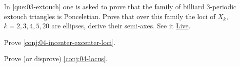 \begin{question}
In \cref{que:03-extouch} one is asked to prove that the family of billiard 3-periodic extouch triangles is Ponceletian. Prove that over this family the loci of $X_k$, $k=2,3,4,5,20$ are ellipses, derive their semi-axes. See it \href{https://bit.ly/2RdtlvH}{Live}.
\end{question}

\begin{question}
Prove \cref{conj:04-incenter-excenter-loci}.
\end{question}

\begin{question}
Prove (or disprove) \cref{conj:04-locus}.
\end{question}